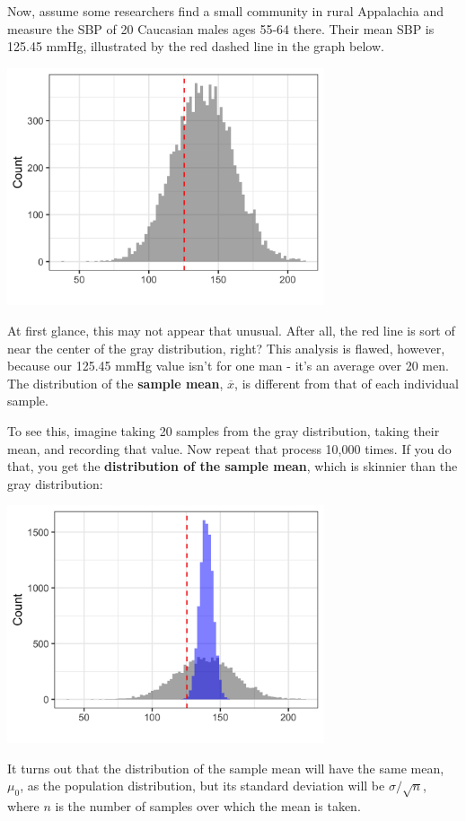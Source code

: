Now, assume some researchers find a small community in rural Appalachia and measure the SBP of 20 Caucasian males ages 55-64 there. Their mean SBP is 125.45 mmHg, illustrated by the red dashed line in the graph below.

\begin{center}
\includegraphics[width=0.7\textwidth]{img/hyp-z-test-example-1.png}
\end{center}

At first glance, this may not appear that unusual. After all, the red line is sort of near the center of the gray distribution, right? This analysis is flawed, however, because our 125.45 mmHg value isn't for one man - it's an average over 20 men. The distribution of the \textbf{sample mean}, $\overline{x}$, is different from that of each individual sample. 

To see this, imagine taking 20 samples from the gray distribution, taking their mean, and recording that value. Now repeat that process 10,000 times. If you do that, you get the \textbf{distribution of the sample mean},  which is skinnier than the gray distribution:
\begin{center}
\includegraphics[width=0.7\textwidth]{img/hyp-z-test-example-2.png}
\end{center}
It turns out that the distribution of the sample mean will have the same mean, $\mu_0$, as the population distribution, but its standard deviation will be $\sigma/\sqrt{n}$, where $n$ is the number of samples over which the mean is taken.


